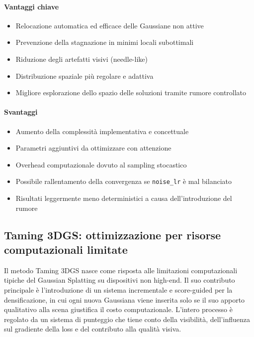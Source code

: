 \paragraph{Vantaggi chiave}
\begin{itemize}
	\item Relocazione automatica ed efficace delle Gaussiane non attive
	\item Prevenzione della stagnazione in minimi locali subottimali
	\item Riduzione degli artefatti visivi (needle-like)
	\item Distribuzione spaziale più regolare e adattiva
	\item Migliore esplorazione dello spazio delle soluzioni tramite rumore controllato
\end{itemize}

\paragraph{Svantaggi}
\begin{itemize}
	\item Aumento della complessità implementativa e concettuale
	\item Parametri aggiuntivi da ottimizzare con attenzione
	\item Overhead computazionale dovuto al sampling stocastico
	\item Possibile rallentamento della convergenza se \texttt{noise\_lr} è mal bilanciato
	\item Risultati leggermente meno deterministici a causa dell'introduzione del rumore
\end{itemize}

\subsection{Taming 3DGS: ottimizzazione per risorse computazionali limitate}

Il metodo Taming 3DGS nasce come risposta alle limitazioni computazionali tipiche del Gaussian Splatting su dispositivi non high-end. Il suo contributo principale è l'introduzione di un sistema incrementale e score-guided per la densificazione, in cui ogni nuova Gaussiana viene inserita solo se il suo apporto qualitativo alla scena giustifica il costo computazionale. L'intero processo è regolato da un sistema di punteggio che tiene conto della visibilità, dell'influenza sul gradiente della loss e del contributo alla qualità visiva.

